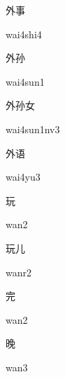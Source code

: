 \begin{verbete}{外事}
\begin{pronuncia}{wai4shi4}
\end{pronuncia}
\end{verbete}

\begin{verbete}{外孙}
\begin{pronuncia}{wai4sun1}
\end{pronuncia}
\end{verbete}

\begin{verbete}{外孙女}
\begin{pronuncia}{wai4sun1nv3}
\end{pronuncia}
\end{verbete}

\begin{verbete}[wai4yu3]{外语}
\begin{pronuncia}{wai4yu3}
\end{pronuncia}
\end{verbete}

\begin{verbete}[wan2]{玩}
\begin{pronuncia}{wan2}
\end{pronuncia}
\end{verbete}

\begin{verbete}[wanr2]{玩儿}
\begin{pronuncia}{wanr2}
\end{pronuncia}
\end{verbete}

\begin{verbete}[wan2]{完}
\begin{pronuncia}{wan2}
\end{pronuncia}
\end{verbete}

\begin{verbete}[wan3]{晚}
\begin{pronuncia}{wan3}
\end{pronuncia}
\end{verbete}


